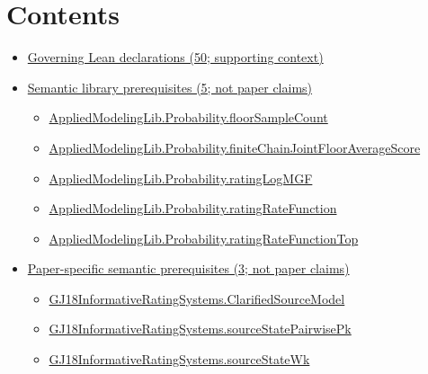 \documentclass[10pt]{article}
\begin{document}
\section*{Contents}
\begin{itemize}[leftmargin=1.2em]
\item \hyperlink{governing-declaration-section-5ef5ef0364b6939c}{Governing Lean declarations (50; supporting context)}
\item \hyperlink{library-section-2ddff18376f19241}{Semantic library prerequisites (5; not paper claims)}
\begin{itemize}[leftmargin=1.2em]
\item \hyperlink{library-prerequisite-b01059f5e405e09c}{Applied\allowbreak{}Modeling\allowbreak{}Lib.\allowbreak{}Probability.\allowbreak{}floor\allowbreak{}Sample\allowbreak{}Count}
\item \hyperlink{library-prerequisite-50e0fc0c0050fdf5}{Applied\allowbreak{}Modeling\allowbreak{}Lib.\allowbreak{}Probability.\allowbreak{}finite\allowbreak{}Chain\allowbreak{}Joint\allowbreak{}Floor\allowbreak{}Average\allowbreak{}Score}
\item \hyperlink{library-prerequisite-60b2b32d038ae336}{Applied\allowbreak{}Modeling\allowbreak{}Lib.\allowbreak{}Probability.\allowbreak{}rating\allowbreak{}Log\allowbreak{}MGF}
\item \hyperlink{library-prerequisite-683e7978382b65db}{Applied\allowbreak{}Modeling\allowbreak{}Lib.\allowbreak{}Probability.\allowbreak{}rating\allowbreak{}Rate\allowbreak{}Function}
\item \hyperlink{library-prerequisite-f4469065f0a02cc9}{Applied\allowbreak{}Modeling\allowbreak{}Lib.\allowbreak{}Probability.\allowbreak{}rating\allowbreak{}Rate\allowbreak{}Function\allowbreak{}Top}
\end{itemize}
\item \hyperlink{paper-prerequisite-section-5ef5ef0364b6939c}{Paper-specific semantic prerequisites (3; not paper claims)}
\begin{itemize}[leftmargin=1.2em]
\item \hyperlink{paper-prerequisite-1ee67f5518d0a925}{GJ18\allowbreak{}Informative\allowbreak{}Rating\allowbreak{}Systems.\allowbreak{}Clarified\allowbreak{}Source\allowbreak{}Model}
\item \hyperlink{paper-prerequisite-e2953365ffe4a1ff}{GJ18\allowbreak{}Informative\allowbreak{}Rating\allowbreak{}Systems.\allowbreak{}source\allowbreak{}State\allowbreak{}Pairwise\allowbreak{}Pk}
\item \hyperlink{paper-prerequisite-6810b88015106e2c}{GJ18\allowbreak{}Informative\allowbreak{}Rating\allowbreak{}Systems.\allowbreak{}source\allowbreak{}State\allowbreak{}Wk}

\end{itemize}
\end{itemize}
\end{document}
